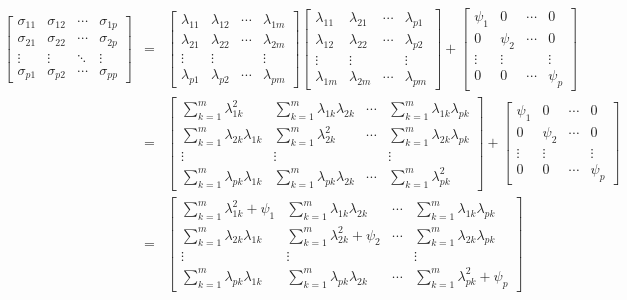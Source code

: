 \documentclass{article}
\begin{document}
\begin{eqnarray*}
\begin{bmatrix}\sigma_{11} & \sigma_{12} & \cdots & \sigma_{1p} \\ \sigma_{21} & \sigma_{22} & \cdots & \sigma_{2p} \\ \vdots & \vdots & \ddots & \vdots \\ \sigma_{p1} & \sigma_{p2} & \cdots & \sigma_{pp}\end{bmatrix} &=& \begin{bmatrix}\lambda_{11} & \lambda_{12} & \cdots & \lambda_{1m} \\ \lambda_{21} & \lambda_{22} & \cdots & \lambda_{2m} \\ \vdots & \vdots & & \vdots \\ \lambda_{p1} & \lambda_{p2} & \cdots & \lambda_{pm}\end{bmatrix} \begin{bmatrix}\lambda_{11} & \lambda_{21} & \cdots & \lambda_{p1} \\ \lambda_{12} & \lambda_{22} & \cdots & \lambda_{p2} \\ \vdots & \vdots & & \vdots \\ \lambda_{1m} & \lambda_{2m} & \cdots & \lambda_{pm}\end{bmatrix}+\begin{bmatrix} \psi_1 & 0 & \cdots & 0\\ 0 & \psi_2 & \cdots & 0\\ \vdots &\vdots & &\vdots\\ 0 & 0 & \cdots & \psi_p\end{bmatrix}\\ &=& \begin{bmatrix} \sum_{k=1}^m\lambda_{1k}^2 & \sum_{k=1}^m\lambda_{1k}\lambda_{2k} & \cdots & \sum_{k=1}^m\lambda_{1k}\lambda_{pk} \\ \sum_{k=1}^m\lambda_{2k}\lambda_{1k} & \sum_{k=1}^m\lambda_{2k}^2 & \cdots & \sum_{k=1}^m\lambda_{2k}\lambda_{pk} \\ \vdots & \vdots & & \vdots \\ \sum_{k=1}^m\lambda_{pk}\lambda_{1k} & \sum_{k=1}^m\lambda_{pk}\lambda_{2k} & \cdots & \sum_{k=1}^m\lambda_{pk}^2 \end{bmatrix} + \begin{bmatrix} \psi_1 & 0 & \cdots & 0\\ 0 & \psi_2 & \cdots & 0\\ \vdots &\vdots & &\vdots\\ 0 & 0 & \cdots & \psi_p\end{bmatrix}\\ &=& \begin{bmatrix} \sum_{k=1}^m\lambda_{1k}^2+\psi_1 & \sum_{k=1}^m\lambda_{1k}\lambda_{2k} & \cdots & \sum_{k=1}^m\lambda_{1k}\lambda_{pk} \\ \sum_{k=1}^m\lambda_{2k}\lambda_{1k} & \sum_{k=1}^m\lambda_{2k}^2+\psi_2 & \cdots & \sum_{k=1}^m\lambda_{2k}\lambda_{pk} \\ \vdots & \vdots & & \vdots \\ \sum_{k=1}^m\lambda_{pk}\lambda_{1k} & \sum_{k=1}^m\lambda_{pk}\lambda_{2k} & \cdots & \sum_{k=1}^m\lambda_{pk}^2+\psi_p\end{bmatrix}
\end{eqnarray*}
\end{document}
